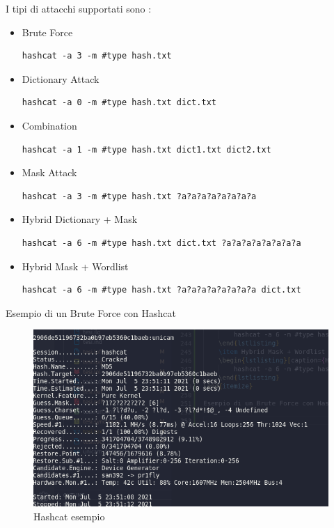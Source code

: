 I tipi di attacchi supportati sono :
\begin{itemize}
    \item Brute Force
          \begin{lstlisting}[caption={Hashcat Brute Force}, style=javaScriptCode]
        hashcat -a 3 -m #type hash.txt 
    \end{lstlisting}
    \item Dictionary Attack
          \begin{lstlisting}[caption={Hashcat Dictionary}, style=javaScriptCode]
        hashcat -a 0 -m #type hash.txt dict.txt 
    \end{lstlisting}
    \item Combination
          \begin{lstlisting}[caption={Hashcat Combination}, style=javaScriptCode]
        hashcat -a 1 -m #type hash.txt dict1.txt dict2.txt
    \end{lstlisting}
    \item Mask Attack
          \begin{lstlisting}[caption={Hashcat Mask}, style=javaScriptCode]
        hashcat -a 3 -m #type hash.txt ?a?a?a?a?a?a?a?a
    \end{lstlisting}
    \item Hybrid Dictionary + Mask
          \begin{lstlisting}[caption={Hashcat Hybrid Dictionary + Mask}, style=javaScriptCode]
        hashcat -a 6 -m #type hash.txt dict.txt ?a?a?a?a?a?a?a?a
    \end{lstlisting}
    \item Hybrid Mask + Wordlist
          \begin{lstlisting}[caption={Hashcat Hybrid Mask + Wordlist}, style=javaScriptCode]
        hashcat -a 6 -m #type hash.txt ?a?a?a?a?a?a?a?a dict.txt
    \end{lstlisting}
\end{itemize}

Esempio di un Brute Force con Hashcat 

\begin{figure}[h!]
    \centering
    \includegraphics[width=\linewidth]{Immagini/1/hashcat_show.png}
    \caption{Hashcat esempio}
    \label{fig:hashcat esempio}
\end{figure}

